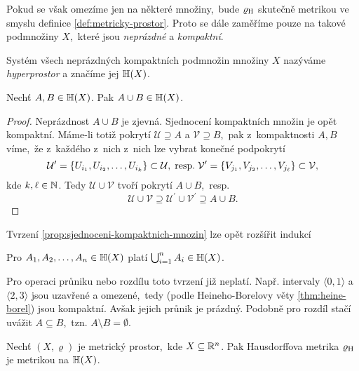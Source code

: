 Pokud se však omezíme jen na některé množiny,~bude $\varrho_\textup{H}$ skutečně metrikou ve smyslu definice \ref{def:metricky-prostor}. Proto se dále zaměříme pouze na takové podmnožiny $X$,~které jsou \emph{neprázdné} a \emph{kompaktní}.
\begin{definition}[Hyperprostor]\label{def:hyperprostor}
    Systém všech neprázdných kompaktních podmnožin množiny $X$ nazýváme \emph{hyperprostor} a značíme jej $\mathbb{H}(X)$.
\end{definition}
\begin{proposition}\label{prop:sjednoceni-kompaktnich-mnozin}
    Nechť $A,B\in\mathbb{H}(X)$. Pak $A\cup B\in\mathbb{H}(X)$.
\end{proposition}
\begin{proof}
    Neprázdnost $A\cup B$ je zjevná. Sjednocení kompaktních množin je opět kompaktní. Máme-li totiž pokrytí $\mathcal{U}\supseteq A$ a $\mathcal{V}\supseteq B$,~pak z~kompaktnosti $A,B$ víme,~že z~každého z~nich z~nich lze vybrat konečné podpokrytí
    \[\mathcal{U}^\prime=\left\{U_{i_1},U_{i_2},\ldots,U_{i_k}\right\}\subset\mathcal{U},\;\text{resp.}\;\mathcal{V}^\prime=\left\{V_{j_1},V_{j_2},\ldots,V_{j_\ell}\right\}\subset\mathcal{V},\]
    kde $k,\ell\in\mathbb{N}$. Tedy $\mathcal{U}\cup\mathcal{V}$ tvoří pokrytí $A\cup B$,~resp.
    \[\mathcal{U}\cup\mathcal{V}\supseteq\mathcal{U}^\prime\cup\mathcal{V}^\prime\supseteq A\cup B.\]
\end{proof}
Tvrzení \ref{prop:sjednoceni-kompaktnich-mnozin} lze opět rozšířit indukcí
\begin{corollary}\label{cor:sjednoceni-n-kompaktnich-mnozin}
    Pro $A_1,A_2,\ldots,A_n\in\mathbb{H}(X)$ platí $\bigcup_{i=1}^n A_i\in\mathbb{H}(X)$.
\end{corollary}
Pro operaci průniku nebo rozdílu toto tvrzení již neplatí. Např. intervaly $\langle0,1\rangle$ a $\langle2,3\rangle$ jsou uzavřené a omezené,~tedy (podle Heineho-Borelovy věty \ref{thm:heine-borel}) jsou kompaktní. Avšak jejich průnik je prázdný. Podobně pro rozdíl stačí uvážit $A\subseteq B$,~tzn. $A\setminus B=\emptyset$.
\begin{theorem}\label{thm:hausdorffova-metrika-je-metrika}
    Nechť $(X,\varrho)$ je metrický prostor,~kde $X\subseteq\mathbb{R}^n$. Pak Hausdorffova metrika $\varrho_\textup{H}$ je metrikou na $\mathbb{H}(X)$.
\end{theorem}
